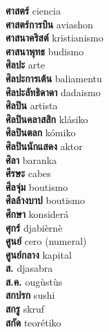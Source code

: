 \textbf{ ศาสตร์  } ciencia \\
\textbf{ ศาสตร์การบิน  } aviashon \\
\textbf{ ศาสนาคริสต์  } kristianismo \\
\textbf{ ศาสนาพุทธ  } budismo \\
\textbf{ ศิลปะ  } arte \\
\textbf{ ศิลปะการเต้น  } baliamentu \\
\textbf{ ศิลปะลัทธิดาดา  } dadaismo \\
\textbf{ ศิลปิน  } artista \\
\textbf{ ศิลปินคลาสสิก  } klásiko \\
\textbf{ ศิลปินตลก  } kómiko \\
\textbf{ ศิลปินนักแสดง  } aktor \\
\textbf{ ศิลา  } baranka \\
\textbf{ ศีรษะ  } cabes \\
\textbf{ ศีลจุ่ม  } boutismo \\
\textbf{ ศีลล้างบาป  } boutismo \\
\textbf{ ศึกษา  } konsiderá \\
\textbf{ ศุกร์  } djabièrnè \\
\textbf{ ศูนย์  } cero (numeral) \\
\textbf{ ศูนย์กลาง  } kapital \\
\textbf{ ส.  } djasabra \\
\textbf{ ส.ค.  } ougùstùs \\
\textbf{ สกปรก  } sushi \\
\textbf{ สกรู  } skruf \\
\textbf{ สกัด  } teorétiko \\
